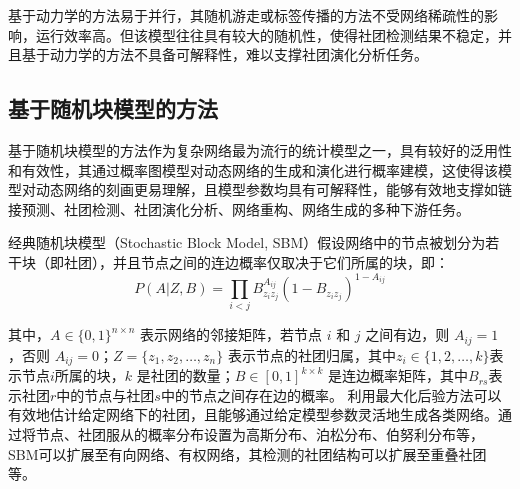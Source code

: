 基于动力学的方法易于并行，其随机游走或标签传播的方法不受网络稀疏性的影响，运行效率高。但该模型往往具有较大的随机性，使得社团检测结果不稳定，并且基于动力学的方法不具备可解释性，难以支撑社团演化分析任务。

\subsection{基于随机块模型的方法}

基于随机块模型的方法作为复杂网络最为流行的统计模型之一\cite{karrer2011stochastic}，具有较好的泛用性和有效性，其通过概率图模型对动态网络的生成和演化进行概率建模，这使得该模型对动态网络的刻画更易理解，且模型参数均具有可解释性，能够有效地支撑如链接预测、社团检测、社团演化分析、网络重构、网络生成的多种下游任务。

经典随机块模型（Stochastic Block Model, SBM）假设网络中的节点被划分为若干块（即社团），并且节点之间的连边概率仅取决于它们所属的块，即：
\[
P(A | Z, B) = \prod_{i < j} B_{z_i z_j}^{A_{ij}} (1 - B_{z_i z_j})^{1 - A_{ij}}
\]

其中，\( A \in \{0, 1\}^{n \times n} \) 表示网络的邻接矩阵，若节点 \( i \) 和 \( j \) 之间有边，则 \( A_{ij} = 1 \)，否则 \( A_{ij} = 0 \)；\( Z = \{z_1, z_2, \dots, z_n\} \) 表示节点的社团归属，其中\( z_i \in \{1, 2, \dots, k\} \)表示节点\( i \)所属的块，\( k \) 是社团的数量；\( B \in [0, 1]^{k \times k} \) 是连边概率矩阵，其中\( B_{rs} \)表示社团\( r \)中的节点与社团\( s \)中的节点之间存在边的概率。
利用最大化后验方法可以有效地估计给定网络下的社团，且能够通过给定模型参数灵活地生成各类网络。通过将节点、社团服从的概率分布设置为高斯分布、泊松分布、伯努利分布等，SBM可以扩展至有向网络、有权网络，其检测的社团结构可以扩展至重叠社团等。

